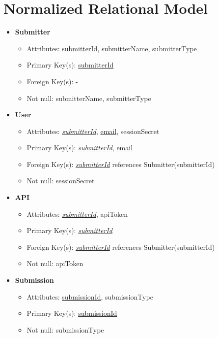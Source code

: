 \documentclass{article}
\begin{document}
\section{Normalized Relational Model}
    \begin{itemize}
        \item \textbf{Submitter}        
        \begin{itemize}
            \item Attributes: \underline{submitterId}, submitterName, submitterType
            \item Primary Key(s): \underline{submitterId}
            \item Foreign Key(s): -
            \item Not null: submitterName, submitterType
        \end{itemize}

        \item \textbf{User}
        \begin{itemize}
            \item Attributes: \underline{\textit{submitterId}}, \underline{email}, sessionSecret
            \item Primary Key(s): \underline{\textit{submitterId}}, \underline{email}
            \item Foreign Key(s): \underline{\textit{submitterId}} references Submitter(submitterId)
            \item Not null: sessionSecret
        \end{itemize}

        \item \textbf{API}
        \begin{itemize}
            \item Attributes: \underline{\textit{submitterId}}, apiToken
            \item Primary Key(s): \underline{\textit{submitterId}}
            \item Foreign Key(s): \underline{\textit{submitterId}} references Submitter(submitterId)
            \item Not null: apiToken
        \end{itemize}

        \item \textbf{Submission}
        \begin{itemize}
            \item Attributes: \underline{submissionId}, submissionType
            \item Primary Key(s): \underline{submissionId}            
            \item Not null: submissionType
        \end{itemize}


\end{itemize}
\end{document}
